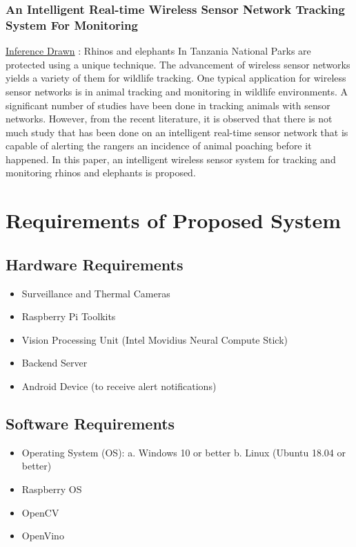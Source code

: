 \documentclass[12pt]{extarticle}
\begin{document}
\subsubsection{An Intelligent Real-time Wireless Sensor Network Tracking System For Monitoring} 
\underline{Inference Drawn} :
Rhinos and elephants In Tanzania National Parks are protected using a unique technique. The advancement of wireless sensor networks yields a variety of them for wildlife tracking. One typical application for wireless sensor networks is in animal tracking and monitoring in wildlife environments. A significant number of studies have been done in tracking animals with sensor networks. However, from the recent literature, it is observed that there is not much study that has been done on an intelligent real-time sensor network that is capable of alerting the rangers an incidence of animal poaching before it happened. In this paper, an intelligent wireless sensor system for tracking and monitoring rhinos and elephants is proposed.

\section{Requirements of Proposed System}

	\subsection{Hardware Requirements}
\begin{itemize}
	\item Surveillance and Thermal Cameras 
	\item Raspberry Pi Toolkits 
	\item Vision Processing Unit (Intel Movidius Neural Compute Stick) 
	\item Backend Server 
	\item Android Device (to receive alert notifications) 
\end{itemize}

\subsection{Software Requirements}
\begin{itemize}
	\item Operating System (OS): 
	\subitem a. Windows 10 or better 
	\subitem b. Linux (Ubuntu 18.04 or better) 
	\item Raspberry OS 
	\item OpenCV 
	\item OpenVino 
\end{itemize}
\end{document}
